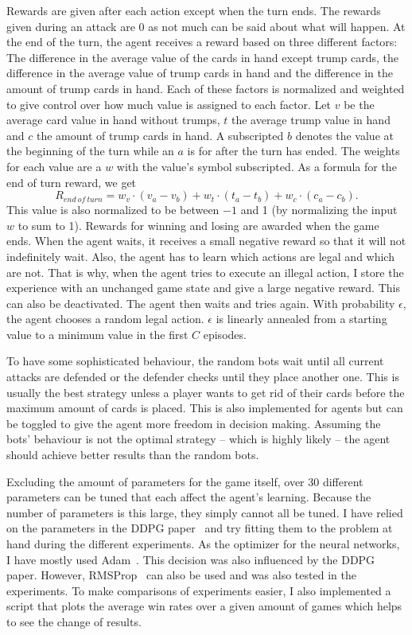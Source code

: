 \documentclass[a4paper,titlepage]{article}
\begin{document}
Rewards are given after each action except when the turn ends. The rewards given during an attack are 0 as not much can be said about what will happen. At the end of the turn, the agent receives a reward based on three different factors: The difference in the average value of the cards in hand except trump cards, the difference in the average value of trump cards in hand and the difference in the amount of trump cards in hand. Each of these factors is normalized and weighted to give control over how much value is assigned to each factor.
Let $v$ be the average card value in hand without trumps, $t$ the average trump value in hand and $c$ the amount of trump cards in hand. A subscripted $b$ denotes the value at the beginning of the turn while an $a$ is for after the turn has ended. The weights for each value are a $w$ with the value's symbol subscripted. As a formula for the end of turn reward, we get
\begin{equation*}
  R_{end\ of\ turn} = w_v \cdot (v_a - v_b) + w_t \cdot (t_a - t_b) + w_c \cdot (c_a - c_b).
\end{equation*}
This value is also normalized to be between $-1$ and 1 (by normalizing the input $w$ to sum to 1). Rewards for winning and losing are awarded when the game ends. When the agent waits, it receives a small negative reward so that it will not indefinitely wait. Also, the agent has to learn which actions are legal and which are not. That is why, when the agent tries to execute an illegal action, I store the experience with an unchanged game state and give a large negative reward. This can also be deactivated. The agent then waits and tries again. With probability $\epsilon$, the agent chooses a random legal action. $\epsilon$ is linearly annealed from a starting value to a minimum value in the first $C$ episodes.

To have some sophisticated behaviour, the random bots wait until all current attacks are defended or the defender checks until they place another one. This is usually the best strategy unless a player wants to get rid of their cards before the maximum amount of cards is placed. This is also implemented for agents but can be toggled to give the agent more freedom in decision making. Assuming the bots' behaviour is not the optimal strategy -- which is highly likely -- the agent should achieve better results than the random bots.

Excluding the amount of parameters for the game itself, over 30 different parameters can be tuned that each affect the agent's learning.
Because the number of parameters is this large, they simply cannot all be tuned. I have relied on the parameters in the DDPG paper~\cite[p.~11]{ddpg} and try fitting them to the problem at hand during the different experiments.
As the optimizer for the neural networks, I have mostly used Adam~\cite{adam}. This decision was also influenced by the DDPG paper. However, RMSProp~\cite{rmsprop} can also be used and was also tested in the experiments.
To make comparisons of experiments easier, I also implemented a script that plots the average win rates over a given amount of games which helps to see the change of results. \medskip
\end{document}
